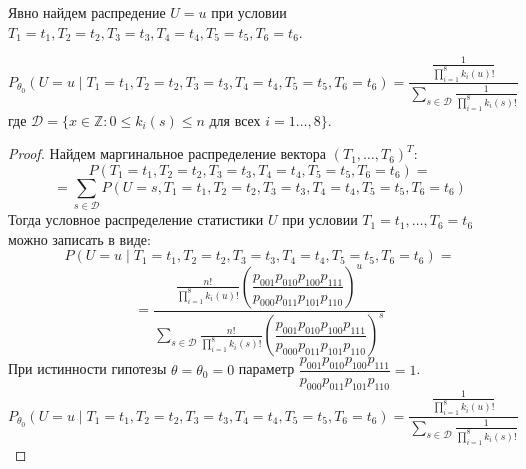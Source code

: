     Явно найдем распредение $U=u$ при условии $T_1=t_1, T_2=t_2, T_3=t_3, T_4=t_4, T_5=t_5, T_6=t_6$.
    \begin{lemma}\label{u_dist}
        $$P_{\theta_0}(U=u \mid T_1=t_1, T_2=t_2, T_3=t_3, T_4=t_4, T_5=t_5, T_6=t_6)=\dfrac{\frac{1}{\prod_{i=1}^8 k_i(u)!}}
            {\sum_{s\in \mathcal{D}} \frac{1}{\prod_{i=1}^8 k_i(s)!}}$$
        где $\mathcal{D}=\{x \in \mathbb{Z}: 0\leq k_i(s) \leq n \text{ для всех } i=1\ldots,8\}$.
    \end{lemma}
    \begin{proof}
        Найдем маргинальное распределение вектора $(T_1,\ldots,T_6)^T$:
        $$P(T_1=t_1, T_2=t_2, T_3=t_3, T_4=t_4, T_5=t_5, T_6=t_6)=$$
        $$=\sum_{s\in \mathcal{D}} P(U=s, T_1=t_1, T_2=t_2, T_3=t_3, T_4=t_4, T_5=t_5, T_6=t_6)$$
        Тогда условное распределение статистики $U$ при условии $T_1=t_1,\ldots,T_6=t_6$ можно записать в виде:
        $$P(U=u \mid T_1=t_1, T_2=t_2, T_3=t_3, T_4=t_4, T_5=t_5, T_6=t_6)=$$
        $$=\dfrac{\frac{n!}{\prod_{i=1}^8 k_i(u)!} \left(\dfrac{p_{001}p_{010}p_{100}p_{111}}{p_{000}p_{011}p_{101}p_{110}}\right)^u}
            {\sum_{s\in \mathcal{D}} \frac{n!}{\prod_{i=1}^8 k_i(s)!} \left(\dfrac{p_{001}p_{010}p_{100}p_{111}}{p_{000}p_{011}p_{101}p_{110}}\right)^s}$$
        При истинности гипотезы $\theta=\theta_0=0$ параметр $\dfrac{p_{001}p_{010}p_{100}p_{111}}{p_{000}p_{011}p_{101}p_{110}}=1$.
        $$P_{\theta_0}(U=u \mid T_1=t_1, T_2=t_2, T_3=t_3, T_4=t_4, T_5=t_5, T_6=t_6)=\dfrac{\frac{1}{\prod_{i=1}^8 k_i(u)!}}
            {\sum_{s\in \mathcal{D}} \frac{1}{\prod_{i=1}^8 k_i(s)!}}$$
    \end{proof}
    
